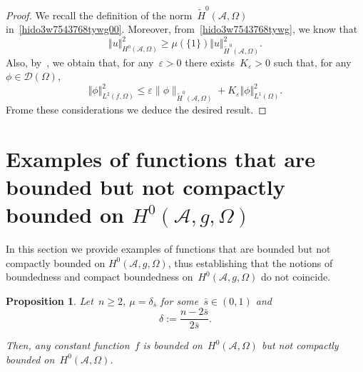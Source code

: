 \documentclass[11pt,hyp,]{nyjm}
\numberwithin{equation}{section}
\newtheorem{proposition}[theorem]{Proposition}
\theoremstyle{remark}
\renewcommand{\leq}{\leqslant}
\renewcommand{\geq}{\geqslant}
\renewcommand{\ge}{\geqslant}
\renewcommand{\epsilon}{\varepsilon}
\begin{document}
\begin{proof}
We recall the definition of the norm~$\tilde{H}^0(\mathcal{A},\Omega)$ 
in~\eqref{hido3w7543768tywg00}. Moreover, from~\eqref{hido3w7543768tywg}, we know that
\begin{equation*}
\Vert u \Vert^2_{H^{0}(\mathcal{A}, \Omega)}\ge \mu(\{1\}) \Vert u \Vert^2_{\tilde{H}^{0}(\mathcal{A}, \Omega)}.
\end{equation*}
Also, by~\cite[Lemma~1.4]{trudinger}, we obtain that, for any~$\epsilon>0$ there exists~$K_{\epsilon}>0$ such that,
for any~$\phi \in \mathcal{D}(\Omega)$,
\begin{equation}\label{dmw}
\Vert \phi \Vert^2_{L^2(f, \Omega)} \leq \epsilon \|\phi\|_{\widetilde{H}^0(\mathcal{A},\Omega)} + K_{\epsilon} \Vert \phi \Vert^2_{L^1(\Omega)}.
\end{equation}
{F}rome these considerations we deduce the desired result.
\end{proof}


\section{Examples of functions that are bounded but not compactly bounded on $H^0(\mathcal{A},g,\Omega)$}\label{counterexa}

In this section we provide examples of functions that
are bounded but not compactly bounded on $H^0(\mathcal{A},g,\Omega)$, thus establishing that
the notions of boundedness and compact boundedness on~$H^0(\mathcal{A},g,\Omega)$ do not coincide.

\begin{proposition}
Let~$n\geq 2$, $\mu= \delta_{\bar{s}}$ for some~$\bar{s}\in (0,1)$ and 
\begin{equation}\label{dced}
\delta:= \frac{n-2\bar{s}}{2\bar{s}}.
\end{equation}

Then, any constant function~$f$ is bounded on~$H^0(\mathcal{A},\Omega)$ but not compactly bounded on~$H^0(\mathcal{A},\Omega)$.
\end{proposition}
\end{document}
